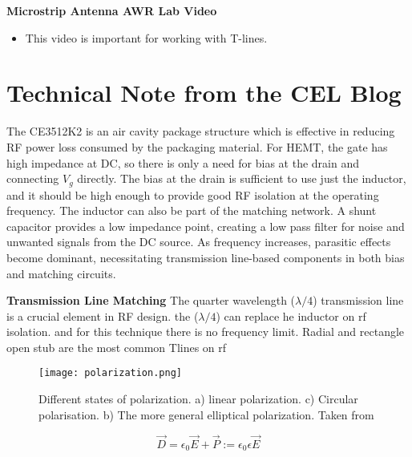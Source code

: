 \documentclass[english]{article}
\begin{document}
\textbf{Microstrip Antenna AWR Lab Video}
\begin{itemize} 
    \item This video is important for working with T-lines.
\end{itemize}

\section{Technical Note from the CEL Blog}
The CE3512K2 is an air cavity package structure which is effective in reducing RF power loss consumed by the packaging material. For HEMT, the gate has high impedance at DC, so there is only a need for bias at the drain and connecting \( V_g \) directly. The bias at the drain is sufficient to use just the inductor, and it should be high enough to provide good RF isolation at the operating frequency. The inductor can also be part of the matching network. A shunt capacitor provides a low impedance point, creating a low pass filter for noise and unwanted signals from the DC source. As frequency increases, parasitic effects become dominant, necessitating transmission line-based components in both bias and matching circuits.

\textbf{Transmission Line Matching}
The quarter wavelength (\( \lambda /4 \)) transmission line is a crucial element in RF design.
the (\(\lambda/4 \)) can replace he inductor on rf isolation. and for this technique there is no frequency limit.
Radial and rectangle open stub are the most common Tlines on rf 




















\begin{figure}[!h]
    \centering
    \texttt{[image: polarization.png]}
    \caption{Different states of polarization. a) linear polarization. c) Circular polarisation. b) The more general elliptical polarization. Taken from \cite{polarization} }
    \label{fig:Polarization}
\end{figure}




\begin{equation}
    \Vec{D}=\epsilon_0 \Vec{E} + \Vec{P} := \epsilon_0 \epsilon \Vec{E}
\end{equation}
\end{document}

